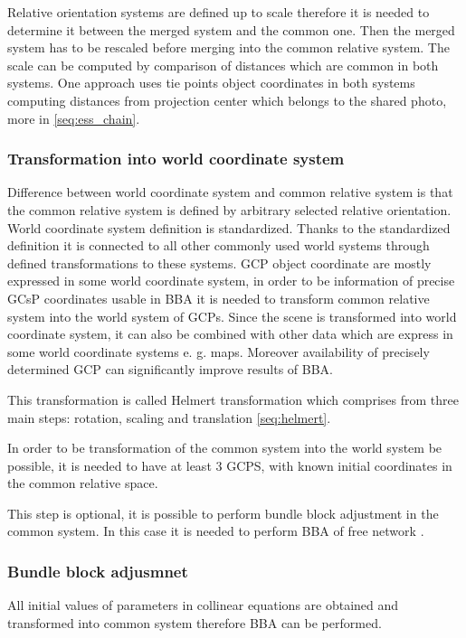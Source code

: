 \documentclass[a4paper,12pt]{article}
\begin{document}
Relative orientation systems are defined up to scale therefore 
it is needed to determine it between the  merged system and the common one. Then the merged system 
has to be rescaled before merging into the common relative system. 
The scale can be computed by comparison of distances which are common in both systems.
One approach uses tie points object coordinates in both systems 
computing distances from projection center which belongs to the shared photo, more in \ref{seq:ess_chain}. 


\subsubsection{Transformation into world coordinate system}
Difference between world coordinate system and common relative system is that the common relative system 
is defined by arbitrary selected relative orientation. World coordinate system definition is standardized.
Thanks to the standardized definition it is connected to all other commonly used  world systems through 
defined transformations to these systems.
GCP object coordinate are mostly expressed in some world coordinate system, in order to be 
information of precise GCsP coordinates usable in BBA it is needed to transform common relative 
system into the world system of GCPs. Since the scene is transformed into world coordinate system,
it can also be combined with other data which are express in some world coordinate systems e. g.
maps. Moreover availability of precisely determined GCP can significantly improve results of BBA.  

This transformation is called Helmert  transformation which comprises from 
three main steps: rotation, scaling and translation \ref{seq:helmert}.

In order to be transformation of the common system into the world system be possible, it is needed 
to have at least 3 GCPS, with known initial coordinates in the common relative space. 
 
This step is optional, it is possible to perform bundle block adjustment in the common system. In this 
case it is needed to perform BBA of free network \label{sec:free_net_least}. 

\subsubsection{Bundle block adjusmnet}

All initial values of parameters in collinear equations are obtained and transformed into common system therefore 
BBA can be performed.
\end{document}
